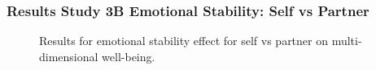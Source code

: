 \documentclass[
  singlecolumn]{article}
\begin{document}
\newpage{}

\subsubsection{Results Study 3B Emotional Stability: Self vs
Partner}\label{results-study-3b-emotional-stability-self-vs-partner}

\begin{figure}


\caption{\label{fig-results-emotional-self}Results for emotional
stability effect for self vs partner on multi-dimensional well-being.}

\end{figure}%

\newpage{}
\end{document}
